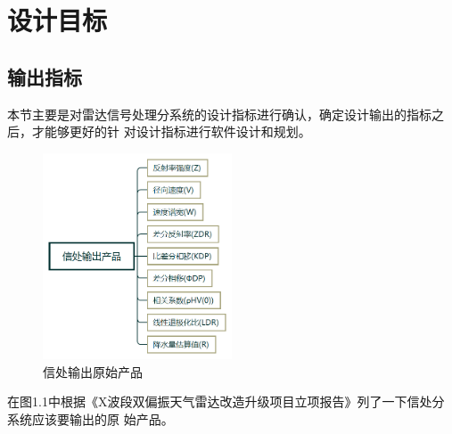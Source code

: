 \documentclass[a4paper,12pt]{report}
\begin{document}
\tableofcontents %

\chapter{设计目标}
\setcounter{page}{1}
\begin{spacing}{1.5}
\songti{}

\section{输出指标}
本节主要是对雷达信号处理分系统的设计指标进行确认，确定设计输出的指标之后，才能够更好的针
对设计指标进行软件设计和规划。
\begin{figure}[hbtp]
    \centering
    \includegraphics [width=0.5\textwidth]{figure//output.png}
    \caption{信处输出原始产品}\label{output}
\end{figure}
在图1.1中根据《X波段双偏振天气雷达改造升级项目立项报告》列了一下信处分系统应该要输出的原
始产品。



\end{spacing}
\end{document}
